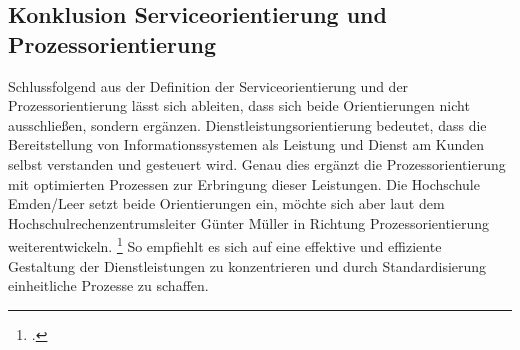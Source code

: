 \subsection{Konklusion Serviceorientierung und Prozessorientierung}
Schlussfolgend aus der Definition der Serviceorientierung und der Prozessorientierung lässt sich ableiten, dass sich beide Orientierungen nicht ausschließen, sondern ergänzen.  Dienstleistungsorientierung bedeutet, dass die Bereitstellung von Informationssystemen als Leistung und Dienst am Kunden selbst verstanden und gesteuert wird. Genau dies ergänzt die Prozessorientierung mit optimierten Prozessen zur Erbringung dieser Leistungen. 
Die Hochschule Emden/Leer setzt beide Orientierungen ein, möchte sich aber laut dem Hochschulrechenzentrumsleiter Günter Müller in Richtung Prozessorientierung weiterentwickeln. \footcite{gunter_muller_interview} So empfiehlt es sich auf eine effektive und effiziente Gestaltung der Dienstleistungen zu konzentrieren und durch Standardisierung einheitliche Prozesse zu schaffen.



